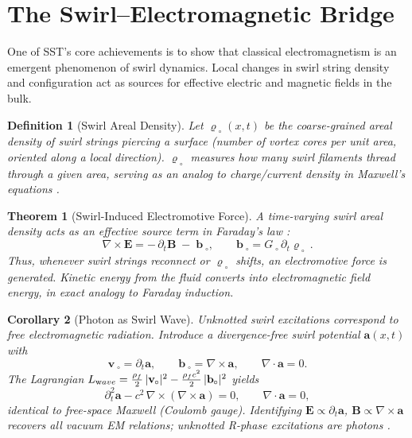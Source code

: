 \documentclass[11pt]{article}
\newtheorem{theorem}{Theorem}[section]
\newtheorem{corollary}[theorem]{Corollary}
\newtheorem{definition}{Definition}[section]
\begin{document}
	\section{The Swirl--Electromagnetic Bridge}
	One of SST’s core achievements is to show that classical electromagnetism is an emergent phenomenon of swirl dynamics. Local changes in swirl string density and configuration act as sources for effective electric and magnetic fields in the bulk.

	\begin{definition}[Swirl Areal Density]
		Let $\varrho_{\!\!\;\circ}(x,t)$ be the coarse-grained areal density of swirl strings piercing a surface (number of vortex cores per unit area, oriented along a local direction). $\varrho_{\!\!\;\circ}$ measures how many swirl filaments thread through a given area, serving as an analog to charge/current density in Maxwell’s equations \cite{Jackson1999,Iskandarani2025MagneticVector}.
	\end{definition}

	\begin{theorem}[Swirl-Induced Electromotive Force]
		A time-varying swirl areal density acts as an effective source term in Faraday’s law \cite{Jackson1999,Iskandarani2025MagneticVector}:
		\[
			\nabla \times \mathbf{E} = -\,\partial_t \mathbf{B} \;-\; \mathbf{b}_{\!\!\;\circ}, \qquad \mathbf{b}_{\!\!\;\circ} = G_{\!\!\;\circ}\,\partial_t \varrho_{\!\!\;\circ}\,.
		\]
		Thus, whenever swirl strings reconnect or $\varrho_{\!\!\;\circ}$ shifts, an electromotive force is generated. Kinetic energy from the fluid converts into electromagnetic field energy, in exact analogy to Faraday induction.
	\end{theorem}

	\begin{corollary}[Photon as Swirl Wave]
		Unknotted swirl excitations correspond to free electromagnetic radiation. Introduce a divergence-free swirl potential $\mathbf{a}(x,t)$ with
		\[
			\mathbf{v}_{\!\!\;\circ} = \partial_t \mathbf{a}, \qquad \mathbf{b}_{\!\!\;\circ} = \nabla \times \mathbf{a}, \qquad \nabla\cdot \mathbf{a}=0.
		\]
		The Lagrangian $L_{\textrm wave} = \frac{\rho_f}{2}\,|\mathbf{v}_{\!\!\;\circ}|^2 - \frac{\rho_f c^2}{2}\,|\mathbf{b}_{\!\!\;\circ}|^2$ yields
		\[
			\partial_t^2 \mathbf{a} - c^2\,\nabla\times(\nabla\times \mathbf{a}) = 0,\qquad \nabla\cdot \mathbf{a}=0,
		\]
		identical to free-space Maxwell (Coulomb gauge). Identifying
		$\mathbf{E} \propto \partial_t \mathbf{a}$, $\mathbf{B}\propto \nabla\times \mathbf{a}$ recovers all vacuum EM relations; unknotted R-phase excitations are photons \cite{Jackson1999,Iskandarani2025DoubleSlit}.
	\end{corollary}
\end{document}
